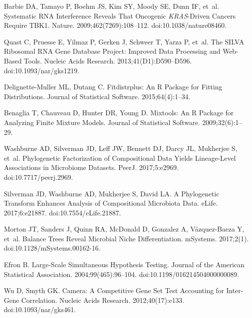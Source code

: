 \documentclass[10pt,letterpaper]{article}
\begin{document}
\begin{thebibliography}{10}
    Barbie DA, Tamayo P, Boehm JS, Kim SY, Moody SE, Dunn IF, et~al.
    \newblock Systematic {{RNA}} Interference Reveals That Oncogenic
      {{{\emph{KRAS}}}}-Driven Cancers Require {{TBK1}}.
    \newblock Nature. 2009;462(7269):108--112.
    \newblock doi:{10.1038/nature08460}.
    
    Quast C, Pruesse E, Yilmaz P, Gerken J, Schweer T, Yarza P, et~al.
    \newblock The {{SILVA}} Ribosomal {{RNA}} Gene Database Project: Improved Data
      Processing and Web-Based Tools.
    \newblock Nucleic Acids Research. 2013;41(D1):D590--D596.
    \newblock doi:{10.1093/nar/gks1219}.
    
    {Delignette-Muller} ML, Dutang C.
    \newblock Fitdistrplus: {{An R}} Package for Fitting Distributions.
    \newblock Journal of Statistical Software. 2015;64(4):1--34.
    
    Benaglia T, Chauveau D, Hunter DR, Young D.
    \newblock Mixtools: {{An R}} Package for Analyzing Finite Mixture Models.
    \newblock Journal of Statistical Software. 2009;32(6):1--29.
    
    Washburne AD, Silverman JD, Leff JW, Bennett DJ, Darcy JL, Mukherjee S, et~al.
    \newblock Phylogenetic Factorization of Compositional Data Yields Lineage-Level
      Associations in Microbiome Datasets.
    \newblock PeerJ. 2017;5:e2969.
    \newblock doi:{10.7717/peerj.2969}.
    
    Silverman JD, Washburne AD, Mukherjee S, David LA.
    \newblock A Phylogenetic Transform Enhances Analysis of Compositional
      Microbiota Data.
    \newblock eLife. 2017;6:e21887.
    \newblock doi:{10.7554/eLife.21887}.
    
    Morton JT, Sanders J, Quinn RA, McDonald D, Gonzalez A, {V{\'a}zquez-Baeza} Y,
      et~al.
    \newblock Balance {{Trees Reveal Microbial Niche Differentiation}}.
    \newblock mSystems. 2017;2(1).
    \newblock doi:{10.1128/mSystems.00162-16}.
    
    Efron B.
    \newblock Large-{{Scale Simultaneous Hypothesis Testing}}.
    \newblock Journal of the American Statistical Association.
      2004;99(465):96--104.
    \newblock doi:{10.1198/016214504000000089}.
    
    Wu D, Smyth GK.
    \newblock Camera: A Competitive Gene Set Test Accounting for Inter-Gene
      Correlation.
    \newblock Nucleic Acids Research. 2012;40(17):e133.
    \newblock doi:{10.1093/nar/gks461}.
    

\end{thebibliography}
\end{document}
